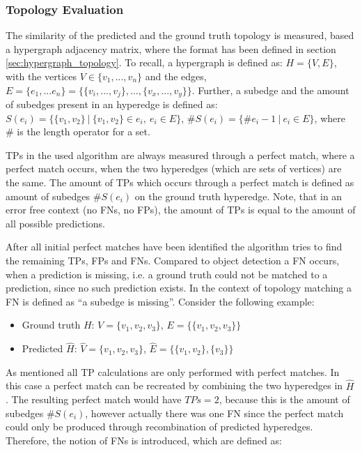 \subsubsection{Topology Evaluation}

The similarity of the predicted and the ground truth topology is measured, based a hypergraph adjacency matrix, where the format has been defined in section \ref{sec:hypergraph_topology}.
To recall, a hypergraph is defined as: $H = \{V, E\}$, with the vertices $V \in \{v_1,...,v_n\}$ and the edges, $E = \{e_1,...e_n\} = \{\{v_i,...,v_j\},...,\{v_x,...,v_y\}\}$.
Further, a subedge and the amount of subedges present in an hyperedge is defined as: $S(e_i) = \{ \{v_1,v_2\}\ |\ \{v_1,v_2\} \in e_i,\ e_i \in E\}$, $\#S(e_i) = \{ \#e_i - 1\ |\  e_i \in E\}$, where \# is the length operator for a set.

\acp{TP} in the used algorithm are always measured through a perfect match, where a perfect match occurs, when the two hyperedges (which are sets of vertices) are the same.
The amount of \acp{TP} which occurs through a perfect match is defined as amount of subedges $\#S(e_i)$ on the ground truth hyperedge.
Note, that in an error free context (no \acp{FN}, no \acp{FP}), the amount of \acp{TP} is equal to the amount of all possible predictions.

After all initial perfect matches have been identified the algorithm tries to find the remaining \acp{TP}, \acp{FP} and \acp{FN}.
Compared to object detection a \ac{FN} occurs, when a prediction is missing, i.e. a ground truth could not be matched to a prediction, since no such prediction exists.
In the context of topology matching a \ac{FN} is defined as ``a subedge is missing''.
Consider the following example:

\begin{itemize}
    \item Ground truth $H$: $V = \{v_1, v_2, v_3\}$, $E = \{\{v_1, v_2, v_3\}\}$
    \item Predicted $\hat{H}$: $\hat{V} = \{v_1, v_2, v_3\}$, $\hat{E} = \{\{v_1, v_2\}, \{v_3\}\}$
\end{itemize}

As mentioned all \ac{TP} calculations are only performed with perfect matches.
In this case a perfect match can be recreated by combining the two hyperedges in $\hat{H}$.
The resulting perfect match would have $TPs = 2$, because this is the amount of subedges $\#S(e_i)$, however actually there was one \ac{FN} since the perfect match could only be produced through recombination of predicted hyperedges.
Therefore, the notion of \acp{FN} is introduced, which are defined as:

